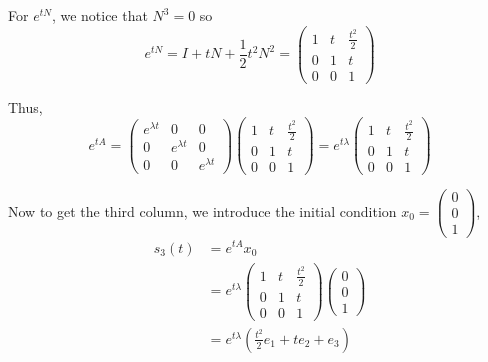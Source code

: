 \documentclass[12pt]{article}
\begin{document}
\begin{enumerate}
        For $e^{tN}$, we notice that $N^3 = 0$ so 
        \[e^{tN} = I + tN + \frac{1}{2}t^2 N^2 = \begin{pmatrix}
            1 & t & \frac{t^2}{2}\\ 
            0 & 1 & t\\ 
            0 & 0 & 1
        \end{pmatrix}\]
        
        Thus,
        \[e^{tA} = \begin{pmatrix}
            e^{\lambda t} & 0 & 0\\ 
            0 & e^{\lambda t} & 0\\ 
            0 & 0 & e^{\lambda t}
        \end{pmatrix} \begin{pmatrix}
            1 & t & \frac{t^2}{2}\\ 
            0 & 1 & t\\ 
            0 & 0 & 1
        \end{pmatrix} = e^{t\lambda} \begin{pmatrix}
            1 & t & \frac{t^2}{2}\\ 
            0 & 1 & t\\ 
            0 & 0 & 1
        \end{pmatrix}\]

        Now to get the third column, we introduce the initial condition $x_0 = \begin{pmatrix}
            0\\0\\1
        \end{pmatrix}$, 
        \begin{align*}
            s_3(t) &= e^{tA}x_0\\ 
                &= e^{t\lambda}\begin{pmatrix}
                1 & t & \frac{t^2}{2}\\ 
                0 & 1 & t\\ 
                0 & 0 & 1
            \end{pmatrix} \begin{pmatrix}
                0\\0\\1
            \end{pmatrix}\\ 
            &= \boxed{e^{t\lambda} (\frac{t^2}{2}e_1 + te_2 + e_3)}
        \end{align*}
    \color{black}
\end{enumerate}
\end{document}
